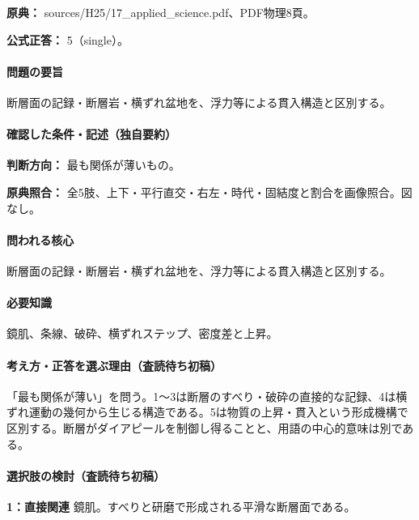 \noindent\textbf{原典：} sources/H25/17\_applied\_science.pdf、PDF物理8頁。

\textbf{公式正答：} 5（single）。

\paragraph{問題の要旨} 断層面の記録・断層岩・横ずれ盆地を、浮力等による貫入構造と区別する。

\paragraph{確認した条件・記述（独自要約）}\mbox{}\par

\noindent\textbf{判断方向：} 最も関係が薄いもの。\par

\noindent\textbf{原典照合：} 全5肢、上下・平行直交・右左・時代・固結度と割合を画像照合。図なし。\par

\paragraph{問われる核心} 断層面の記録・断層岩・横ずれ盆地を、浮力等による貫入構造と区別する。

\paragraph{必要知識} 鏡肌、条線、破砕、横ずれステップ、密度差と上昇。

\paragraph{考え方・正答を選ぶ理由（査読待ち初稿）} 「最も関係が薄い」を問う。1〜3は断層のすべり・破砕の直接的な記録、4は横ずれ運動の幾何から生じる構造である。5は物質の上昇・貫入という形成機構で区別する。断層がダイアピールを制御し得ることと、用語の中心的意味は別である。

\paragraph{選択肢の検討（査読待ち初稿）}\mbox{}\par

\noindent\textbf{1：直接関連} 鏡肌。すべりと研磨で形成される平滑な断層面である。\par

